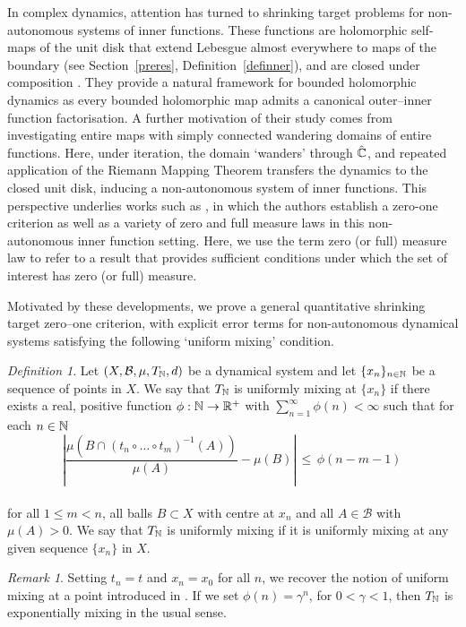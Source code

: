\documentclass[11pt,reqno]{amsart}
\newcommand{\R}{{\Bbb R}}
\newcommand{\N}{{\Bbb N}}
\newcommand{\C}{{\Bbb C}}
\newcommand{\0}{\mathbf{0}}
\newtheorem{definition}{Definition}
\theoremstyle{remark}
\newtheorem{remark}{{Remark}}
\numberwithin{equation}{section}
\newtheorem{definition}[theorem]{Definition}
\theoremstyle{remark}
\newtheorem*{remark}{Remark}
\numberwithin{equation}{section}
\begin{document}
 In complex dynamics, attention has turned to shrinking target problems for non-autonomous systems of inner functions. These functions are holomorphic self-maps of the unit disk that extend Lebesgue almost everywhere to maps of the boundary (see Section~\ref{preres}, Definition~\ref{definner}), and are closed under composition \cite[Theorem~2]{ryff}.    
They provide a natural framework for bounded holomorphic dynamics as every bounded holomorphic map admits a canonical outer–inner function factorisation.
A further motivation of their study comes from investigating entire maps with simply connected wandering domains of entire functions. Here, under iteration, the domain `wanders' through $\hat\C$, and repeated application of the Riemann Mapping Theorem transfers the dynamics to the closed unit disk, inducing a non-autonomous system of inner functions.
This perspective underlies works such as \cite{BERFS}, in which the authors establish a zero-one criterion as well as a variety of zero and full measure laws in this non-autonomous inner function setting. Here, we use the term zero (or full) measure law to refer to a result that provides sufficient conditions under which the set of interest has zero (or full) measure.

Motivated by these developments, we prove a general quantitative shrinking target zero–one criterion, with explicit error terms for non-autonomous dynamical systems satisfying the following `uniform mixing' condition.

\begin{definition}\label{ABunimix}
 Let  $(X,\mathcal{B},\mu,T_{ \N},d)$ be a dynamical system and let $\{x_n\}_{n \in \N}$ be a sequence of points in $X$. We say that $T_\N$ is uniformly mixing at $\{x_n\}$ if there exists a  real, positive function $\phi: \N \to \R^+$ with $ \sum_{n=1}^{\infty} \phi(n) < \infty$ such that for each $n \in \N$
 \\
 \begin{equation}\label{unimixing1}
\left|\frac{\mu(B\cap (t_n \circ \dots \circ t_m)^{-1}(A))}{\mu(A)}-\mu(B)\right| \,  \le  \,  \phi(n-m-1) \, 
\end{equation}
\\
 for all $1 \le m<n$, all balls $B \subset X$ with centre at $x_n$ and all $A \in \mathcal{B}$ with $\mu(A)>0$. We say that $T_\N$ is uniformly mixing if it is uniformly mixing at any given sequence $\{x_n\}$ in $X$.
\end{definition}
\begin{remark}\label{fmpmix}
Setting $t_n=t$ and $x_n=x_0$ for all $n$, we recover the notion of uniform mixing at a point introduced in \cite[Definition~2]{FMP}. If we set $\phi(n)=\gamma^n $, for $0<\gamma<1$, then $T_\N$ is exponentially mixing in the usual sense. 
\end{remark}
\end{document}
